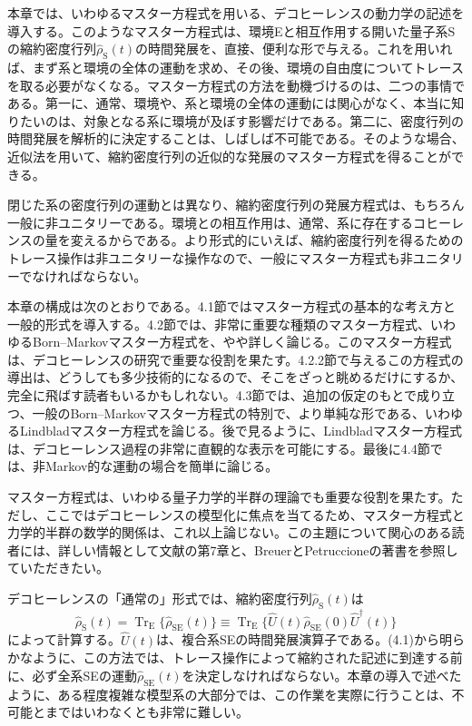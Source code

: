 \hypertarget{srcpage:153}{}\label{srcpage:153}
本章では、いわゆるマスター方程式を用いる、デコヒーレンスの動力学の記述を導入する。このようなマスター方程式は、環境Eと相互作用する開いた量子系Sの縮約密度行列$\hat\rho_{\mathrm S}(t)$の時間発展を、直接、便利な形で与える。これを用いれば、まず系と環境の全体の運動を求め、その後、環境の自由度についてトレースを取る必要がなくなる。マスター方程式の方法を動機づけるのは、二つの事情である。第一に、通常、環境や、系と環境の全体の運動には関心がなく、本当に知りたいのは、対象となる系に環境が及ぼす影響だけである。第二に、密度行列の時間発展を解析的に決定することは、しばしば不可能である。そのような場合、近似法を用いて、縮約密度行列の近似的な発展のマスター方程式を得ることができる。

閉じた系の密度行列の運動とは異なり、縮約密度行列の発展方程式は、もちろん一般に非ユニタリーである。環境との相互作用は、通常、系に存在するコヒーレンスの量を変えるからである。より形式的にいえば、縮約密度行列を得るためのトレース操作は非ユニタリーな操作なので、一般にマスター方程式も非ユニタリーでなければならない。

本章の構成は次のとおりである。4.1節ではマスター方程式の基本的な考え方と一般的形式を導入する。4.2節では、非常に重要な種類のマスター方程式、いわゆるBorn--Markovマスター方程式を、やや詳しく論じる。このマスター方程式は、デコヒーレンスの研究で重要な役割を果たす。4.2.2節で与えるこの方程式の導出は、どうしても多少技術的になるので、そこをざっと眺めるだけにするか、完全に飛ばす読者もいるかもしれない。4.3節では、追加の仮定のもとで成り立つ、一般のBorn--Markovマスター方程式の特別で、より単純な形である、いわゆるLindbladマスター方程式を論じる。後で見るように、Lindbladマスター方程式は、デコヒーレンス過程の非常に直観的な表示を可能にする。最後に4.4節では、非Markov的な運動の場合を簡単に論じる。

マスター方程式は、いわゆる量子力学的半群の理論でも重要な役割を果たす。ただし、ここではデコヒーレンスの模型化に焦点を当てるため、マスター方程式と力学的半群の数学的関係は、これ以上論じない。この主題について関心のある読者には、詳しい情報として文献\cite{ref017}の第7章と、BreuerとPetruccioneの著書\cite{ref018}を参照していただきたい。

\hypertarget{srcpage:154}{}\label{srcpage:154}
デコヒーレンスの「通常の」形式では、縮約密度行列$\hat\rho_{\mathrm S}(t)$は
\begin{equation}
\hat\rho_{\mathrm S}(t)=\operatorname{Tr}_{\mathrm E}\{\hat\rho_{\mathrm{SE}}(t)\}
\equiv\operatorname{Tr}_{\mathrm E}\{\hat U(t)\hat\rho_{\mathrm{SE}}(0)\hat U^{\dagger}(t)\}
\tag{4.1}
\end{equation}
によって計算する。$\hat U(t)$は、複合系SEの時間発展演算子である。(4.1)から明らかなように、この方法では、トレース操作によって縮約された記述に到達する前に、必ず全系SEの運動$\hat\rho_{\mathrm{SE}}(t)$を決定しなければならない。本章の導入で述べたように、ある程度複雑な模型系の大部分では、この作業を実際に行うことは、不可能とまではいわなくとも非常に難しい。

